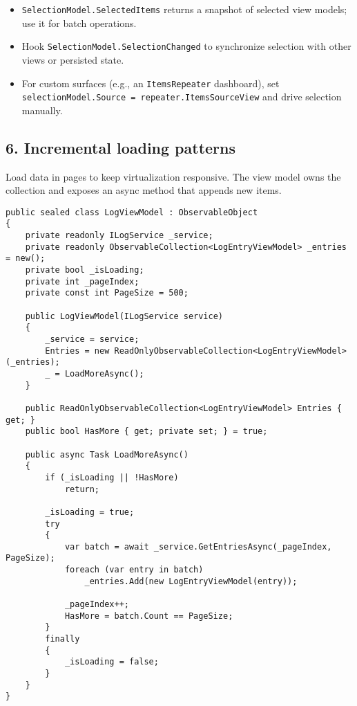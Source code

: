 \begin{itemize}
\tightlist
\item
  \passthrough{\lstinline!SelectionModel.SelectedItems!} returns a
  snapshot of selected view models; use it for batch operations.
\item
  Hook \passthrough{\lstinline!SelectionModel.SelectionChanged!} to
  synchronize selection with other views or persisted state.
\item
  For custom surfaces (e.g., an \passthrough{\lstinline!ItemsRepeater!}
  dashboard), set
  \passthrough{\lstinline!selectionModel.Source = repeater.ItemsSourceView!}
  and drive selection manually.
\end{itemize}

\subsection{6. Incremental loading
patterns}\label{incremental-loading-patterns}

Load data in pages to keep virtualization responsive. The view model
owns the collection and exposes an async method that appends new items.

\begin{lstlisting}
public sealed class LogViewModel : ObservableObject
{
    private readonly ILogService _service;
    private readonly ObservableCollection<LogEntryViewModel> _entries = new();
    private bool _isLoading;
    private int _pageIndex;
    private const int PageSize = 500;

    public LogViewModel(ILogService service)
    {
        _service = service;
        Entries = new ReadOnlyObservableCollection<LogEntryViewModel>(_entries);
        _ = LoadMoreAsync();
    }

    public ReadOnlyObservableCollection<LogEntryViewModel> Entries { get; }
    public bool HasMore { get; private set; } = true;

    public async Task LoadMoreAsync()
    {
        if (_isLoading || !HasMore)
            return;

        _isLoading = true;
        try
        {
            var batch = await _service.GetEntriesAsync(_pageIndex, PageSize);
            foreach (var entry in batch)
                _entries.Add(new LogEntryViewModel(entry));

            _pageIndex++;
            HasMore = batch.Count == PageSize;
        }
        finally
        {
            _isLoading = false;
        }
    }
}
\end{lstlisting}

